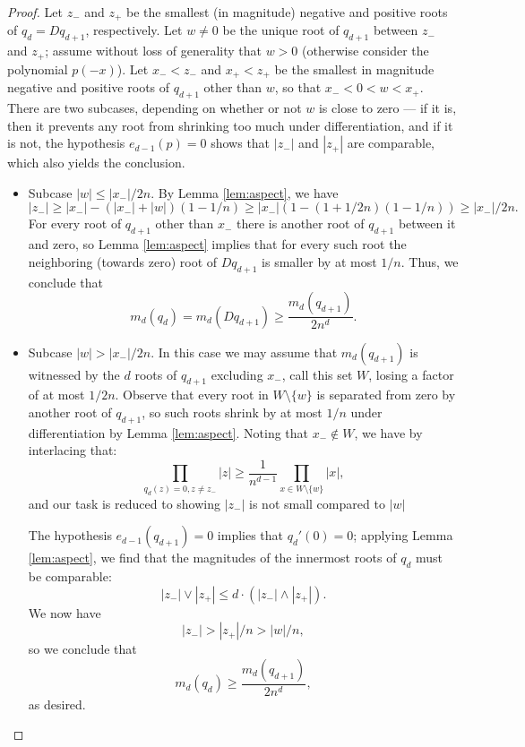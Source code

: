 \begin{proof}
  Let $z_-$ and $z_+$ be the smallest
	(in magnitude) negative and positive roots of $q_d=Dq_{d+1}$, respectively. 
	Let $w\neq 0$ be the unique root of $q_{d+1}$ between $z_-$ and $z_+$; assume without loss of generality that $w>0$ (otherwise 
	consider the polynomial $p(-x)$). Let $x_-< z_-$ and $x_+< z_+$ be the smallest
	in magnitude negative and positive roots of $q_{d+1}$ other than $w$, so that $x_- < 0<  w< x_+$. There
	are two subcases, depending on whether or not $w$ is close to zero --- if it is, then it prevents any root from
	shrinking too much under differentiation, and if it is not, the hypothesis $e_{d-1}(p)=0$ shows that $|z_-|$ and $|z_+|$ are
	comparable, which also yields the conclusion.
	\begin{itemize}
		\item Subcase $|w|\le |x_-|/2n$. By Lemma \ref{lem:aspect}, we have
			$$|z_-|\ge |x_-| - (|x_-|+|w|)(1-1/n) \ge |x_-|(1-(1+1/2n)(1-1/n))\ge |x_-|/2n.$$
			For every root of $q_{d+1}$ other than $x_-$ there is another root of $q_{d+1}$ between it and zero,
			so Lemma \ref{lem:aspect} implies that for every such root the neighboring (towards zero) root of $Dq_{d+1}$
			is smaller by at most $1/n$. Thus, we conclude that
			$$m_d(q_d)=m_d(Dq_{d+1})\ge \frac{m_d(q_{d+1})}{2n^{d}}.$$
		\item Subcase $|w|>|x_-|/2n$. In this case we may assume that $m_d(q_{d+1})$ is witnessed by the $d$ roots of $q_{d+1}$
			excluding $x_-$, call this set $W$, losing a factor of at most $1/2n$. Observe that every root in $W\setminus \{w\}$ 
			is separated from zero by another root of $q_{d+1}$, so such roots shrink by at most $1/n$ under differentiation
			by Lemma \ref{lem:aspect}. Noting that $x_-\notin W$, we have by interlacing that:
			$$ \prod_{q_d(z)=0, z\neq z_-}|z| \ge \frac{1}{n^{d-1}}\prod_{x\in W\setminus \{w\}} |x|,$$
			and our task is reduced to showing $|z_-|$ is not small compared to $|w|$

			The hypothesis $e_{d-1}(q_{d+1})=0$ implies that
		$q_d'(0)=0$; applying Lemma \ref{lem:aspect}, we find that the magnitudes of the innermost roots of $q_d$ must be comparable:
		$$|z_-|\lor |z_+|\le d\cdot (|z_-|\land|z_+|).$$ We now have
			$$|z_-|>|z_+|/n>|w|/n,$$
			so we conclude that
			$$m_d(q_d)\ge \frac{m_d(q_{d+1})}{2n^d},$$
			as desired.
	\end{itemize}


\end{proof}
